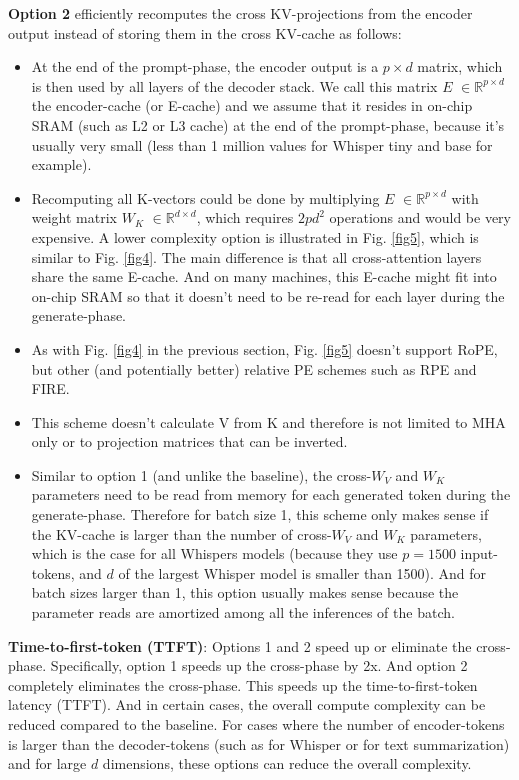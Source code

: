 \documentclass{article}
\newcommand{\eR}[2]{$\in \mathbb{R}^{#1 \times #2}$} %
\begin{document}
\textbf{Option 2} efficiently recomputes the cross KV-projections from the encoder output instead of storing them in the cross KV-cache as follows:
\begin{itemize}[topsep=-1pt]
  \item At the end of the prompt-phase, the encoder output is a $p \times d$ matrix, which is then used by all layers of the decoder stack. We call this matrix $E$ \eR{p}{d} the encoder-cache (or E-cache) and we assume that it resides in on-chip SRAM (such as L2 or L3 cache) at the end of the prompt-phase, because it’s usually very small (less than 1 million values for Whisper tiny and base for example).
  \item Recomputing all K-vectors could be done by multiplying $E$ \eR{p}{d} with weight matrix $W_K$ \eR{d}{d}, which requires $2 p d^2$ operations and would be very expensive. A lower complexity option is illustrated in Fig. \ref{fig5}, which is similar to Fig. \ref{fig4}. The main difference is that all cross-attention layers share the same E-cache. And on many machines, this E-cache might fit into on-chip SRAM so that it doesn’t need to be re-read for each layer during the generate-phase.
  \item As with Fig. \ref{fig4} in the previous section, Fig. \ref{fig5} doesn’t support RoPE, but other (and potentially better) relative PE schemes such as RPE and FIRE.
  \item This scheme doesn’t calculate V from K and therefore is not limited to MHA only or to projection matrices that can be inverted.
  \item Similar to option 1 (and unlike the baseline), the cross-$W_V$ and $W_K$ parameters need to be read from memory for each generated token during the generate-phase. Therefore for batch size 1, this scheme only makes sense if the KV-cache is larger than the number of cross-$W_V$ and $W_K$ parameters, which is the case for all Whispers models (because they use $p = 1500$ input-tokens, and $d$ of the largest Whisper model is smaller than 1500). And for batch sizes larger than 1, this option usually makes sense because the parameter reads are amortized among all the inferences of the batch.
\end{itemize}




\textbf{Time-to-first-token (TTFT)}: Options 1 and 2 speed up or eliminate the cross-phase. Specifically, option 1 speeds up the cross-phase by 2x. And option 2 completely eliminates the cross-phase. This speeds up the time-to-first-token latency (TTFT). And in certain cases, the overall compute complexity can be reduced compared to the baseline. For cases where the number of encoder-tokens is larger than the decoder-tokens (such as for Whisper or for text summarization) and for large $d$ dimensions, these options can reduce the overall complexity.
\end{document}
